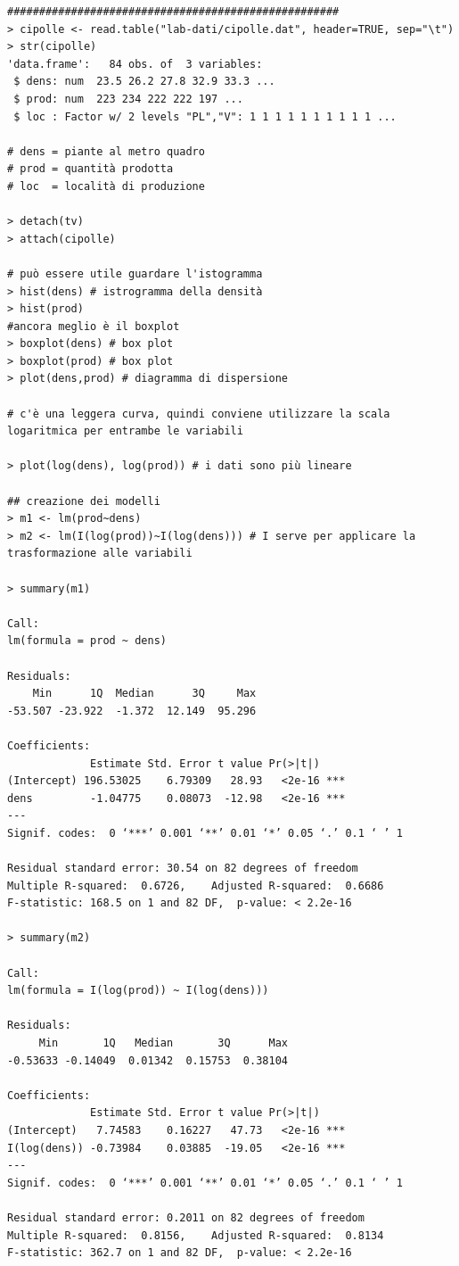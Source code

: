\begin{verbatim}
####################################################
> cipolle <- read.table("lab-dati/cipolle.dat", header=TRUE, sep="\t")
> str(cipolle)
'data.frame':   84 obs. of  3 variables:
 $ dens: num  23.5 26.2 27.8 32.9 33.3 ...
 $ prod: num  223 234 222 222 197 ...
 $ loc : Factor w/ 2 levels "PL","V": 1 1 1 1 1 1 1 1 1 1 ...

# dens = piante al metro quadro
# prod = quantità prodotta
# loc  = località di produzione

> detach(tv)
> attach(cipolle)

# può essere utile guardare l'istogramma
> hist(dens) # istrogramma della densità
> hist(prod)
#ancora meglio è il boxplot
> boxplot(dens) # box plot
> boxplot(prod) # box plot
> plot(dens,prod) # diagramma di dispersione

# c'è una leggera curva, quindi conviene utilizzare la scala logaritmica per entrambe le variabili

> plot(log(dens), log(prod)) # i dati sono più lineare

## creazione dei modelli
> m1 <- lm(prod~dens)
> m2 <- lm(I(log(prod))~I(log(dens))) # I serve per applicare la trasformazione alle variabili

> summary(m1)

Call:
lm(formula = prod ~ dens)

Residuals:
    Min      1Q  Median      3Q     Max 
-53.507 -23.922  -1.372  12.149  95.296 

Coefficients:
             Estimate Std. Error t value Pr(>|t|)    
(Intercept) 196.53025    6.79309   28.93   <2e-16 ***
dens         -1.04775    0.08073  -12.98   <2e-16 ***
---
Signif. codes:  0 ‘***’ 0.001 ‘**’ 0.01 ‘*’ 0.05 ‘.’ 0.1 ‘ ’ 1

Residual standard error: 30.54 on 82 degrees of freedom
Multiple R-squared:  0.6726,    Adjusted R-squared:  0.6686 
F-statistic: 168.5 on 1 and 82 DF,  p-value: < 2.2e-16

> summary(m2)

Call:
lm(formula = I(log(prod)) ~ I(log(dens)))

Residuals:
     Min       1Q   Median       3Q      Max 
-0.53633 -0.14049  0.01342  0.15753  0.38104 

Coefficients:
             Estimate Std. Error t value Pr(>|t|)    
(Intercept)   7.74583    0.16227   47.73   <2e-16 ***
I(log(dens)) -0.73984    0.03885  -19.05   <2e-16 ***
---
Signif. codes:  0 ‘***’ 0.001 ‘**’ 0.01 ‘*’ 0.05 ‘.’ 0.1 ‘ ’ 1

Residual standard error: 0.2011 on 82 degrees of freedom
Multiple R-squared:  0.8156,    Adjusted R-squared:  0.8134 
F-statistic: 362.7 on 1 and 82 DF,  p-value: < 2.2e-16


\end{verbatim}
